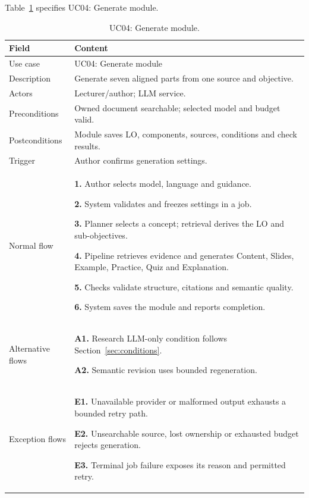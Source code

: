 \needspace{.39\textheight}
Table~\ref{tab:uc-04} specifies UC04: Generate module.
\begin{table}[H]\centering\footnotesize{}\renewcommand{\arraystretch}{1.05}
\caption{UC04: Generate module.}\label{tab:uc-04}
\begin{tabular}{|p{2.8cm}|p{11.9cm}|}\hline
\textbf{Field} & \textbf{Content}\\\hline
Use case & UC04: Generate module\\\hline
Description & Generate seven aligned parts from one source and objective.\\\hline
Actors & Lecturer/author; LLM service.\\\hline
Preconditions & Owned document searchable; selected model and budget valid.\\\hline
Postconditions & Module saves LO, components, sources, conditions and check results.\\\hline
Trigger & Author confirms generation settings.\\\hline
Normal flow & \textbf{1.} Author selects model, language and guidance.\par \textbf{2.} System validates and freezes settings in a job.\par \textbf{3.} Planner selects a concept; retrieval derives the LO and sub-objectives.\par \textbf{4.} Pipeline retrieves evidence and generates Content, Slides, Example, Practice, Quiz and Explanation.\par \textbf{5.} Checks validate structure, citations and semantic quality.\par \textbf{6.} System saves the module and reports completion.\\\hline
Alternative flows & \textbf{A1.} Research LLM-only condition follows Section~\ref{sec:conditions}.\par \textbf{A2.} Semantic revision uses bounded regeneration.\\\hline
Exception flows & \textbf{E1.} Unavailable provider or malformed output exhausts a bounded retry path.\par \textbf{E2.} Unsearchable source, lost ownership or exhausted budget rejects generation.\par \textbf{E3.} Terminal job failure exposes its reason and permitted retry.\\\hline
\end{tabular}\end{table}


